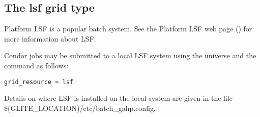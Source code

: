 
\subsection{\label{sec:LSF}The lsf grid type }

Platform LSF is a popular batch system. See the Platform LSF web page
()
for more information about LSF.

Condor jobs may be submitted to a local LSF system
using the  universe and the
 command as follows:
\begin{verbatim}
grid_resource = lsf
\end{verbatim}

Details on where LSF is installed on the local system are
given in the file \$(GLITE\_LOCATION)/etc/batch\_gahp.config.

